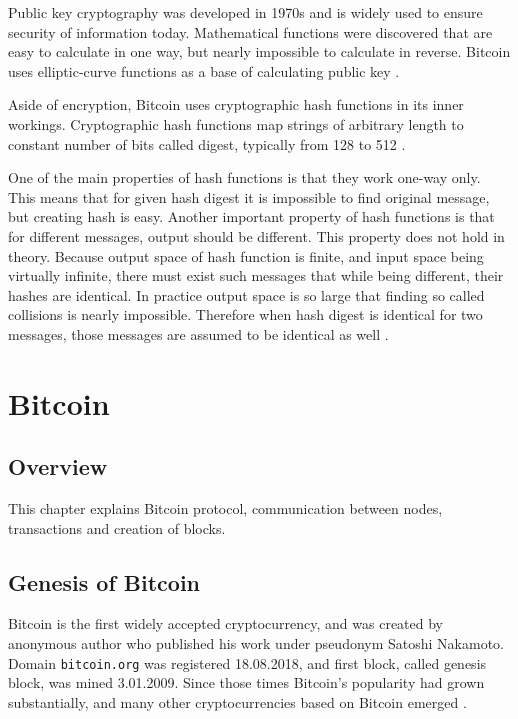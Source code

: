 \documentclass[12pt, en, eng, oneside, final]{mgr}
\begin{document}
Public key cryptography was developed in 1970s and is widely used to ensure security of information today. Mathematical functions were discovered that are easy to calculate in one way, but nearly impossible to calculate in reverse. Bitcoin uses elliptic-curve functions as a base of calculating public key \cite{bartek}.

Aside of encryption, Bitcoin uses cryptographic hash functions in its inner workings. Cryptographic hash functions map strings of arbitrary length to constant number of bits called digest, typically from 128 to 512 \cite{hash-functions}. 

One of the main properties of hash functions is that they work one-way only. This means that for given hash digest it is impossible to find original message, but creating hash is easy. Another important property of hash functions is that for different messages, output should be different. This property does not hold in theory. Because output space of hash function is finite, and input space being virtually infinite, there must exist such messages that while being different, their hashes are identical. In practice output space is so large that finding so called collisions is nearly impossible. Therefore when hash digest is identical for two messages, those messages are assumed to be identical as well \cite{hash-functions}.


\chapter{Bitcoin}

\section{Overview}

This chapter explains Bitcoin protocol, communication between nodes, transactions and creation of blocks.

\section{Genesis of Bitcoin}
Bitcoin is the first widely accepted cryptocurrency, and was created by anonymous author who published his work under pseudonym Satoshi Nakamoto. Domain \texttt{bitcoin.org} was registered 18.08.2018, and first block, called genesis block, was mined 3.01.2009. Since those times Bitcoin's popularity had grown substantially, and many other cryptocurrencies based on Bitcoin emerged \cite{bitcoin-history}.
\end{document}
